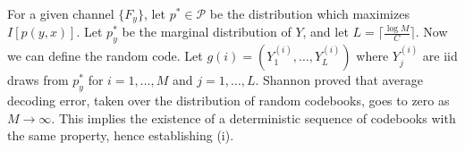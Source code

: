 For a given channel $\{F_y\}$, let $p^* \in \mathcal{P}$ be the
distribution which maximizes $I[p(y, x)]$.  Let $p^*_y$ be the
marginal distribution of $Y$, and let $L = \lceil \frac{\log M}{C}
\rceil$.  Now we can define the random code.  Let $g(i) =
(Y_1^{(i)},\hdots, Y_L^{(i)})$ where $Y_j^{(i)}$ are iid draws from
$p^*_y$ for $i = 1,\hdots, M$ and $j = 1,\hdots, L$.  Shannon proved
that average decoding error, taken over the distribution of random
codebooks, goes to zero as $M \to \infty$.  This implies the existence
of a deterministic sequence of codebooks with the same property, hence
establishing (i).
